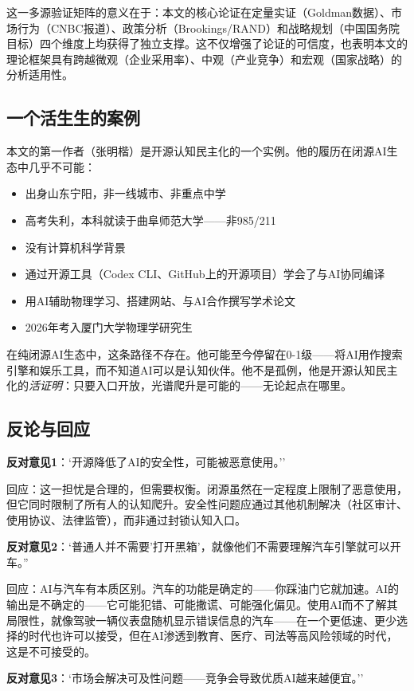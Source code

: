 \documentclass[12pt,a4paper]{ctexart}
\begin{document}
这一多源验证矩阵的意义在于：本文的核心论证在定量实证（Goldman数据）、市场行为（CNBC报道）、政策分析（Brookings/RAND）和战略规划（中国国务院目标）四个维度上均获得了独立支撑。这不仅增强了论证的可信度，也表明本文的理论框架具有跨越微观（企业采用率）、中观（产业竞争）和宏观（国家战略）的分析适用性。


\subsection{一个活生生的案例}

本文的第一作者（张明楷）是开源认知民主化的一个实例。他的履历在闭源AI生态中几乎不可能：
\begin{itemize}
\item 出身山东宁阳，非一线城市、非重点中学
\item 高考失利，本科就读于曲阜师范大学——非985/211
\item 没有计算机科学背景
\item 通过开源工具（Codex CLI、GitHub上的开源项目）学会了与AI协同编译
\item 用AI辅助物理学习、搭建网站、与AI合作撰写学术论文
\item 2026年考入厦门大学物理学研究生
\end{itemize}

在纯闭源AI生态中，这条路径不存在。他可能至今停留在0-1级——将AI用作搜索引擎和娱乐工具，而不知道AI可以是认知伙伴。他不是孤例，他是开源认知民主化的\textit{活证明}：只要入口开放，光谱爬升是可能的——无论起点在哪里。

\subsection{反论与回应}

\textbf{反对意见1}：`开源降低了AI的安全性，可能被恶意使用。''

回应：这一担忧是合理的，但需要权衡。闭源虽然在一定程度上限制了恶意使用，但它同时限制了所有人的认知爬升。安全性问题应通过其他机制解决（社区审计、使用协议、法律监管），而非通过封锁认知入口。

\textbf{反对意见2}：`普通人并不需要'打开黑箱'，就像他们不需要理解汽车引擎就可以开车。''

回应：AI与汽车有本质区别。汽车的功能是确定的——你踩油门它就加速。AI的输出是不确定的——它可能犯错、可能撒谎、可能强化偏见。使用AI而不了解其局限性，就像驾驶一辆仪表盘随机显示错误信息的汽车——在一个更低速、更少选择的时代也许可以接受，但在AI渗透到教育、医疗、司法等高风险领域的时代，这是不可接受的。

\textbf{反对意见3}：`市场会解决可及性问题——竞争会导致优质AI越来越便宜。''
\end{document}
